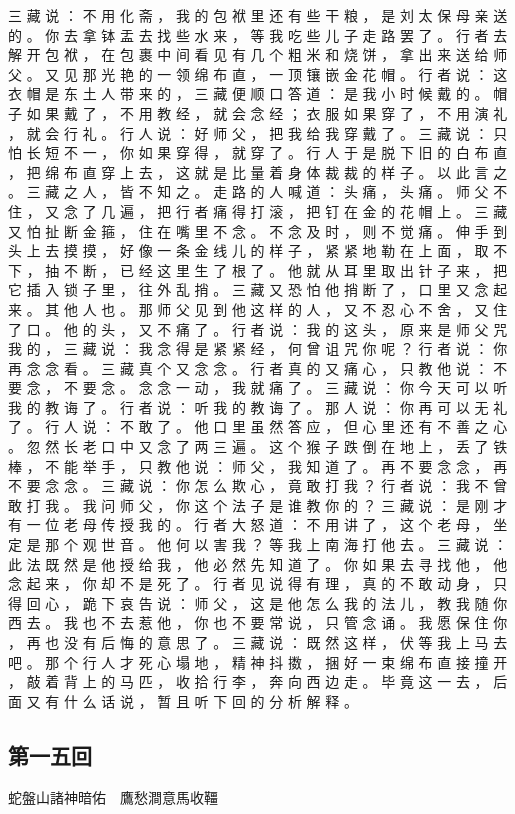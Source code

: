 {三 藏 说 ： 不 用 化 斋 ， 我 的 包 袱 里 还 有 些 干 粮 ， 是 刘 太 保 母 亲 送 的 。
你 去 拿 钵 盂 去 找 些 水 来 ， 等 我 吃 些 儿 子 走 路 罢 了 。
行 者 去 解 开 包 袱 ， 在 包 裹 中 间 看 见 有 几 个 粗 米 和 烧 饼 ， 拿 出 来 送 给 师 父 。
又 见 那 光 艳 的 一 领 绵 布 直 ， 一 顶 镶 嵌 金 花 帽 。
行 者 说 ： 这 衣 帽 是 东 土 人 带 来 的 ， 三 藏 便 顺 口 答 道 ： 是 我 小 时 候 戴 的 。
帽 子 如 果 戴 了 ， 不 用 教 经 ， 就 会 念 经 ； 衣 服 如 果 穿 了 ， 不 用 演 礼 ， 就 会 行 礼 。
行 人 说 ： 好 师 父 ， 把 我 给 我 穿 戴 了 。
三 藏 说 ： 只 怕 长 短 不 一 ， 你 如 果 穿 得 ， 就 穿 了 。
行 人 于 是 脱 下 旧 的 白 布 直 ， 把 绵 布 直 穿 上 去 ， 这 就 是 比 量 着 身 体 裁 裁 的 样 子 。
以 此 言 之 。
三 藏 之 人 ， 皆 不 知 之 。
走 路 的 人 喊 道 ： 头 痛 ， 头 痛 。
师 父 不 住 ， 又 念 了 几 遍 ， 把 行 者 痛 得 打 滚 ， 把 钉 在 金 的 花 帽 上 。
三 藏 又 怕 扯 断 金 箍 ， 住 在 嘴 里 不 念 。
不 念 及 时 ， 则 不 觉 痛 。
伸 手 到 头 上 去 摸 摸 ， 好 像 一 条 金 线 儿 的 样 子 ， 紧 紧 地 勒 在 上 面 ， 取 不 下 ， 抽 不 断 ， 已 经 这 里 生 了 根 了 。
他 就 从 耳 里 取 出 针 子 来 ， 把 它 插 入 锁 子 里 ， 往 外 乱 捎 。
三 藏 又 恐 怕 他 捎 断 了 ， 口 里 又 念 起 来 。
其 他 人 也 。
那 师 父 见 到 他 这 样 的 人 ， 又 不 忍 心 不 舍 ， 又 住 了 口 。
他 的 头 ， 又 不 痛 了 。
行 者 说 ： 我 的 这 头 ， 原 来 是 师 父 咒 我 的 ， 三 藏 说 ： 我 念 得 是 紧 紧 经 ， 何 曾 诅 咒 你 呢 ？ 行 者 说 ： 你 再 念 念 看 。
三 藏 真 个 又 念 念 。
行 者 真 的 又 痛 心 ， 只 教 他 说 ： 不 要 念 ， 不 要 念 。
念 念 一 动 ， 我 就 痛 了 。
三 藏 说 ： 你 今 天 可 以 听 我 的 教 诲 了 。 行 者 说 ： 听 我 的 教 诲 了 。
那 人 说 ： 你 再 可 以 无 礼 了 。 行 人 说 ： 不 敢 了 。
他 口 里 虽 然 答 应 ， 但 心 里 还 有 不 善 之 心 。
忽 然 长 老 口 中 又 念 了 两 三 遍 。
这 个 猴 子 跌 倒 在 地 上 ， 丢 了 铁 棒 ， 不 能 举 手 ， 只 教 他 说 ： 师 父 ， 我 知 道 了 。
再 不 要 念 念 ， 再 不 要 念 念 。
三 藏 说 ： 你 怎 么 欺 心 ， 竟 敢 打 我 ？ 行 者 说 ： 我 不 曾 敢 打 我 。
我 问 师 父 ， 你 这 个 法 子 是 谁 教 你 的 ？ 三 藏 说 ： 是 刚 才 有 一 位 老 母 传 授 我 的 。
行 者 大 怒 道 ： 不 用 讲 了 ， 这 个 老 母 ， 坐 定 是 那 个 观 世 音 。
他 何 以 害 我 ？ 等 我 上 南 海 打 他 去 。
三 藏 说 ： 此 法 既 然 是 他 授 给 我 ， 他 必 然 先 知 道 了 。
你 如 果 去 寻 找 他 ， 他 念 起 来 ， 你 却 不 是 死 了 。 行 者 见 说 得 有 理 ， 真 的 不 敢 动 身 ， 只 得 回 心 ， 跪 下 哀 告 说 ： 师 父 ， 这 是 他 怎 么 我 的 法 儿 ， 教 我 随 你 西 去 。
我 也 不 去 惹 他 ， 你 也 不 要 常 说 ， 只 管 念 诵 。
我 愿 保 住 你 ， 再 也 没 有 后 悔 的 意 思 了 。
三 藏 说 ： 既 然 这 样 ， 伏 等 我 上 马 去 吧 。
那 个 行 人 才 死 心 塌 地 ， 精 神 抖 擞 ， 捆 好 一 束 绵 布 直 接 撞 开 ， 敲 着 背 上 的 马 匹 ， 收 拾 行 李 ， 奔 向 西 边 走 。
毕 竟 这 一 去 ， 后 面 又 有 什 么 话 说 ， 暂 且 听 下 回 的 分 析 解 释 。
}\switchcolumn\flushpage  \begin{pinyinscope}{\myfontt \section{第一五回}     蛇盤山諸神暗佑　鷹愁澗意馬收韁

}
\end{pinyinscope}
